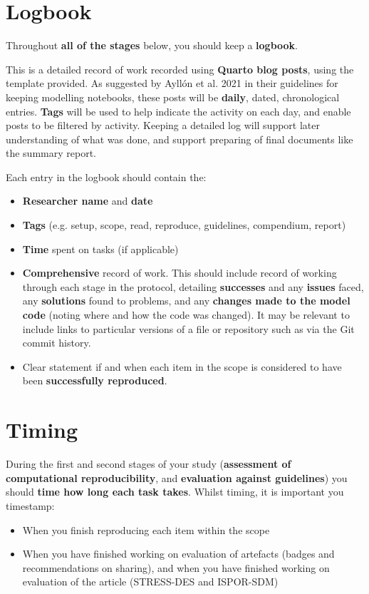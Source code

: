 \newpage
\section{Logbook}

Throughout \textbf{all of the stages} below, you should keep a \textbf{logbook}.

This is a detailed record of work recorded using \textbf{Quarto blog posts}, using the template provided. As suggested by Ayllón et al. 2021\autocite{ayllon_keeping_2021} in their guidelines for keeping modelling notebooks, these posts will be \textbf{daily}, dated, chronological entries. \textbf{Tags} will be used to help indicate the activity on each day, and enable posts to be filtered by activity. Keeping a detailed log will support later understanding of what was done, and support preparing of final documents like the summary report.

Each entry in the logbook should contain the:
\begin{itemize}
    \item \textbf{Researcher name} and \textbf{date}
    \item \textbf{Tags} (e.g. setup, scope, read, reproduce, guidelines, compendium, report)
    \item \textbf{Time} spent on tasks (if applicable)
    \item \textbf{Comprehensive} record of work. This should include record of working through each stage in the protocol, detailing \textbf{successes} and any \textbf{issues} faced, any \textbf{solutions} found to problems, and any \textbf{changes made to the model code} (noting where and how the code was changed). It may be relevant to include links to particular versions of a file or repository such as via the Git commit history.
    \item Clear statement if and when each item in the scope is considered to have been \textbf{successfully reproduced}.
\end{itemize}

\newpage
\section{Timing}

During the first and second stages of your study (\textbf{assessment of computational reproducibility}, and \textbf{evaluation against guidelines}) you should \textbf{time how long each task takes}. Whilst timing, it is important you timestamp:
\begin{itemize}
    \item When you finish reproducing each item within the scope
    \item When you have finished working on evaluation of artefacts (badges and recommendations on sharing), and when you have finished working on evaluation of the article (STRESS-DES and ISPOR-SDM)
\end{itemize}


